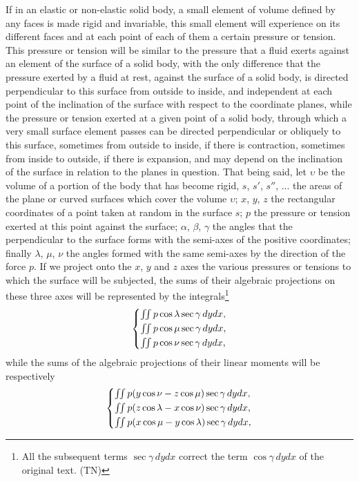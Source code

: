 \documentclass[leqno,openright,smallroyalvopaper,8pt,twoside,showtrims]{memoir}
\begin{document}
If in an elastic or non-elastic solid body, a small element of volume defined by any faces is made rigid and invariable, this small element will experience on its different faces and at each point of each of them a certain pressure or tension. This pressure or tension will be similar to the pressure that a fluid exerts against an element of the surface of a solid body, with the only difference that the pressure exerted by a fluid at rest, against the surface of a solid body, is directed perpendicular to this surface from outside to inside, and independent at each point of the inclination of the surface with respect to the coordinate planes, while the pressure or tension exerted at a given point of a solid body, through which a very small surface element passes can be directed perpendicular or obliquely to this surface, sometimes from outside to inside, if there is contraction, sometimes from inside to outside, if there is expansion, and may depend on the inclination of the surface in relation to the planes in question. That being said, let $\upsilon$ be the volume of a portion of the body that has become rigid, $s$, $s'$, $s''$, ... the areas of the plane or curved surfaces which cover the volume $\upsilon$; $x$, $y$, $z$ the rectangular coordinates of a point taken at random in the surface $s$; $p$ the pressure or tension exerted at this point against the surface; $\alpha$, $\beta$, $\gamma$ the angles that the perpendicular to the surface forms with the semi-axes of the positive coordinates; finally $\lambda$, $\mu$, $\nu$ the angles formed with the same semi-axes by the direction of the force $p$. If we project onto the $x$, $y$ and $z$ axes the various pressures or tensions to which the surface will be subjected, the sums of their algebraic projections on these three axes will be represented by the integrals\footnote{All the subsequent terms $\sec\gamma\, dydx$ correct the term  $\cos\gamma\, dydx$ of the original text. (TN)}
 \begin{equation}\label{eq:forcas}
   \begin{dcases}
     \textstyle\iint   p\cos\lambda\sec\gamma\, dydx,\\
     \textstyle\iint   p\cos\mu\sec\gamma\, dydx,\\
     \textstyle\iint   p\cos\nu\sec\gamma\, dydx,
   \end{dcases}
 \end{equation}
while the sums of the algebraic projections of their linear moments will be respectively
 \begin{equation}
   \begin{dcases}
     \textstyle\iint   p(y\cos\nu-z\cos\mu)\sec\gamma\, dydx,\\
     \textstyle\iint   p(z\cos\lambda-x\cos\nu)\sec\gamma\, dydx,\\
     \textstyle\iint   p(x\cos\mu-y\cos\lambda)\sec\gamma\, dydx,
   \end{dcases}
 \end{equation}
\end{document}
